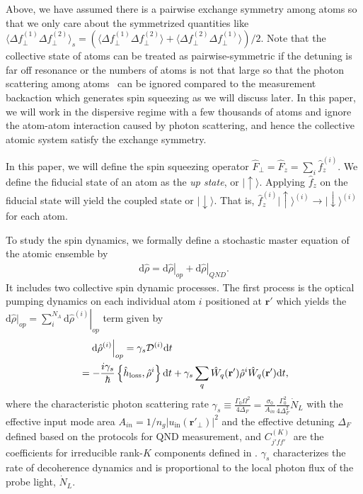 \documentclass[aps,pra,twocolumn,superscriptaddress]{revtex4-1} %
\def\br{\mathbf{r}}
\def\ket#1{\lvert{#1}\rangle}%
\newcommand{\expect}[1]{\big\langle #1 \big\rangle}
\begin{document}
Above, we have assumed there is a pairwise exchange symmetry among atoms so that we only care about the symmetrized quantities like $ \expect{\Delta f_\perp^{(1)}\Delta f_\perp^{(2)}}_s=\left(\expect{\Delta f_\perp^{(1)}\Delta f_\perp^{(2)}} + \expect{\Delta f_\perp^{(2)}\Delta f_\perp^{(1)}} \right)/2 $. 
Note that the collective state of atoms can be treated as pairwise-symmetric if the detuning is far off resonance or the numbers of atoms is not that large so that the photon scattering among atoms~\cite{Asenjo-Garcia2017Atom,Asenjo-Garcia2017Exponential} can be ignored compared to the measurement backaction which generates spin squeezing as we will discuss later.
In this paper, we will work in the dispersive regime with a few thousands of atoms and ignore the atom-atom interaction caused by photon scattering, and hence the collective atomic system satisfy the exchange symmetry. 

In this paper, we will define the spin squeezing operator $ \hat{F}_\perp=\hat{F}_z=\sum_i\hat{f}_z^{(i)} $. 
We define the fiducial state of an atom as the \textit{up state}, or $ \ket{\uparrow} $. 
Applying $ \hat{f}_z $ on the fiducial state will yield the coupled state or $ \ket{\downarrow} $.
That is, $ \hat{f}_z^{(i)}\ket{\uparrow}^{(i)}\rightarrow \ket{\downarrow}^{(i)} $ for each atom.

To study the spin dynamics, we formally define a stochastic master equation of the atomic ensemble by
\begin{align}\label{eq:totaldrhodt}
\mathrm{d}\hat{\rho}=\left.\mathrm{d}\hat{\rho}\right|_{op} + \left.\mathrm{d}\hat{\rho}\right|_{QND}.
\end{align}
It includes two collective spin dynamic processes. 
The first process is the optical pumping dynamics on each individual atom $i$ positioned at $\br'$ which yields the $\mathrm{d}\hat{\rho}|_{op}=\sum_i^{N_A} \left.\mathrm{d}\hat{\rho}^{(i)}\right|_{op} $ term given by
\begin{align}
&\quad\left.\mathrm{d}\hat{\rho}^{(i)}\right|_{op} =\gamma_s\mathcal{D}^{(i)}\mathrm{d}t\\
&= -\frac{i\gamma_s}{\hbar} \left\{\hat{h}_{\rm loss},\hat{\rho}^{i} \right\}\mathrm{d}t + \gamma_s\sum_q \hat{W}_q(\br')\hat{\rho}^{i}\hat{W}_q(\br')\mathrm{d}t,
\end{align}
where the characteristic photon scattering rate $ \gamma_s\equiv \frac{\Gamma_0\Omega^2}{4\Delta_F}=\frac{\sigma_0}{A_{in}}\frac{\Gamma_0^2}{4\Delta_F^2}\dot{N}_L $ with the effective input mode area $ A_{in}=1/n_g|u_{\mathrm{in}}(\br'\!_\perp)|^2 $ and the effective detuning $ \Delta_F $ defined based on the protocols for QND measurement, and $ C_{j'ff'}^{(K)} $ are the coefficients for irreducible rank-$K$ components defined in \cite{Deutsch2010a}.
$\gamma_s$ characterizes the rate of decoherence dynamics and is proportional to the local photon flux of the probe light, $ \dot{N}_L $.
\end{document}

